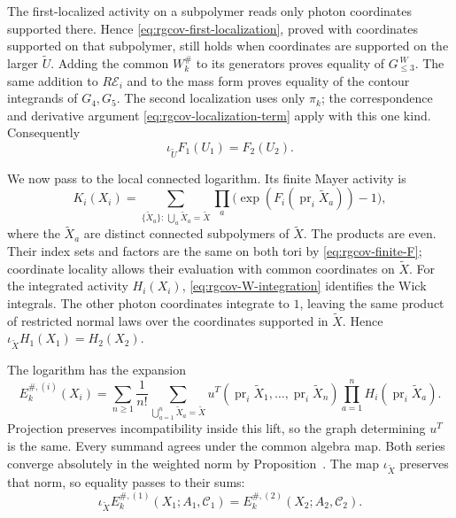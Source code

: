 The first-localized activity on a subpolymer reads
only photon coordinates supported there. Hence
\eqref{eq:rgcov-first-localization}, proved with coordinates
supported on that subpolymer, still holds when coordinates
are supported on the larger $\widetilde U$.
Adding the common $W_k^\#$ to its generators proves
equality of $G_{\le3}^{\,W}$.
The same addition to $R\mathscr E_i$ and to the mass
form proves equality of the contour integrands of
$G_4,G_5$. The second localization uses only $\pi_k$;
the correspondence and derivative argument
\eqref{eq:rgcov-localization-term} apply with this
one kind. Consequently
\begin{equation}\label{eq:rgcov-finite-F}
                       \iota_{\widetilde U}F_1(U_1)=F_2(U_2).
\end{equation}

We now pass to the local connected logarithm.
Its finite Mayer activity is
\[
 K_i(X_i)=\sum_{\{\widetilde X_a\}:\,\bigcup_a\widetilde X_a=\widetilde X}
                \prod_a\big(\exp(F_i(\operatorname{pr}_i
                                                    \widetilde X_a))-1\big),
\]
where the $\widetilde X_a$ are distinct connected
subpolymers of $\widetilde X$.
The products are even. Their index sets and factors
are the same on both tori by
\eqref{eq:rgcov-finite-F}; coordinate locality allows
their evaluation with common coordinates on
$\widetilde X$.
For the integrated activity $H_i(X_i)$,
\eqref{eq:rgcov-W-integration} identifies the Wick
integrals. The other photon coordinates integrate
to $1$, leaving the same product of restricted normal
laws over the coordinates supported in
$\widetilde X$. Hence $\iota_{\widetilde X}H_1(X_1)=H_2(X_2)$.

The logarithm has the expansion
\[
 E_k^{\#,(i)}(X_i)=
   \sum_{n\ge1}\frac1{n!}
    \sum_{\bigcup_{a=1}^n\widetilde X_a=\widetilde X}
       u^T(\operatorname{pr}_i\widetilde X_1,\ldots,
                    \operatorname{pr}_i\widetilde X_n)
                      \prod_{a=1}^n H_i(\operatorname{pr}_i\widetilde X_a).
\]
Projection preserves incompatibility inside this lift,
so the graph determining $u^T$ is the same.
Every summand agrees under the common algebra map.
Both series converge absolutely in the weighted norm
by Proposition~.
The map $\iota_{\widetilde X}$ preserves that norm,
so equality passes to their sums:
\begin{equation}\label{eq:rgcov-logarithm-agreement}
       \iota_{\widetilde X}E_k^{\#,(1)}(X_1;A_1,\mathscr C_1)
                      =E_k^{\#,(2)}(X_2;A_2,\mathscr C_2).
\end{equation}

